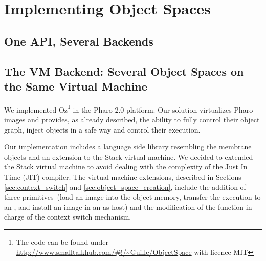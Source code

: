 
\chapter{Implementing Object Spaces}
\minitoc
\introduction


\section{One API, Several Backends}

\section{The VM Backend: Several Object Spaces on the Same Virtual Machine}


We implemented Oz\footnote{The code can be found under \url{http://www.smalltalkhub.com/\#!/~Guille/ObjectSpace} with licence MIT} in the Pharo 2.0 platform. Our solution virtualizes Pharo images and provides, as already described, the ability to fully control their object graph, inject objects in a safe way and control their execution.

Our implementation includes a language side library resembling the membrane objects and an extension to the Stack virtual machine. We decided to extended the Stack virtual machine to avoid dealing with the complexity of the Just In Time (JIT) compiler. The virtual machine extensions, described in Sections \ref{sec:context_switch} and \ref{sec:object_space_creation}, include the addition of three primitives~(load an image into the object memory, transfer the execution to an \objectspace, and install an image in an \objectspace as host) and the modification of the function in charge of the context switch mechanism.



